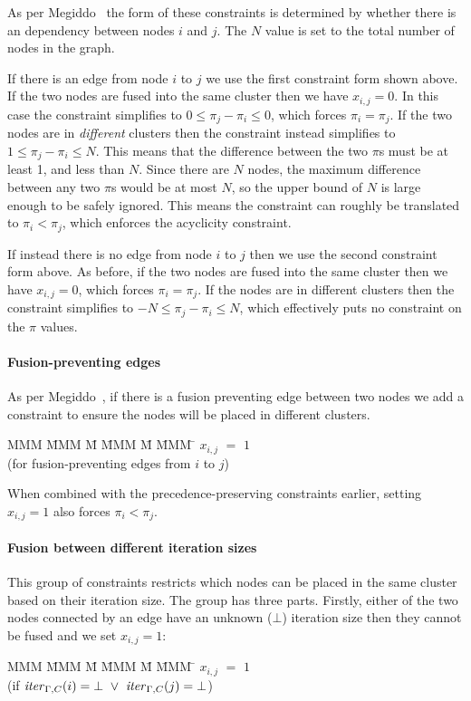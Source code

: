 As per Megiddo~\cite{megiddo1998optimal} the form of these constraints is determined by whether there is an dependency between nodes $i$ and $j$. The $N$ value is set to the total number of nodes in the graph.

If there is an edge from node $i$ to $j$ we use the first constraint form shown above. If the two nodes are fused into the same cluster then we have $x_{i,j} = 0$. In this case the constraint simplifies to $0 \le \pi_j - \pi_i \le 0$, which forces $\pi_i = \pi_j$. If the two nodes are in \emph{different} clusters then the constraint instead simplifies to $1 \le \pi_j - \pi_i \le N$. This means that the difference between the two $\pi$s must be at least 1, and less than $N$. Since there are $N$ nodes, the maximum difference between any two $\pi$s would be at most $N$, so the upper bound of $N$ is large enough to be safely ignored. This means the constraint can roughly be translated to $\pi_i < \pi_j$, which enforces the acyclicity constraint.

If instead there is no edge from node $i$ to $j$ then we use the second constraint form above. As before, if the two nodes are fused into the same cluster then we have $x_{i,j} = 0$, which forces $\pi_i = \pi_j$. If the nodes are in different clusters then the constraint simplifies to $-N \le \pi_j - \pi_i \le N$, which effectively puts no constraint on the $\pi$ values.


\paragraph{Fusion-preventing edges} As per Megiddo~\cite{megiddo1998optimal}, if there is a fusion preventing edge between two nodes we add a constraint to ensure the nodes will be placed in different clusters.
\begin{tabbing}
MMM     \= MMM \= M  \= MMM \= M \= MMM \= \kill
        \> $x_{i,j}$ \> $=$ \> $1$ \>   \> \\
        \> (for fusion-preventing edges from $i$ to $j$) 
\end{tabbing}

When combined with the precedence-preserving constraints earlier, setting $x_{i,j} = 1$ also forces $\pi_i < \pi_j$. 


\paragraph{Fusion between different iteration sizes} This group of constraints restricts which nodes can be placed in the same cluster based on their iteration size. The group has three parts. 
Firstly, either of the two nodes connected by an edge have an unknown ($\bot$) iteration size then they cannot be fused and we set $x_{i,j} = 1$:
\begin{tabbing}
MMM     \= MMM \= M \= MMM \= M \= MMM \= \kill
        \> $x_{i,j}$   \> $=$   \> $1$          \>       \>     \\
        \> (if $\mathit{iter}_{\Gamma,C}(i) = \bot 
                ~\vee~ \mathit{iter}_{\Gamma,C}(j) = \bot$)
\end{tabbing}

